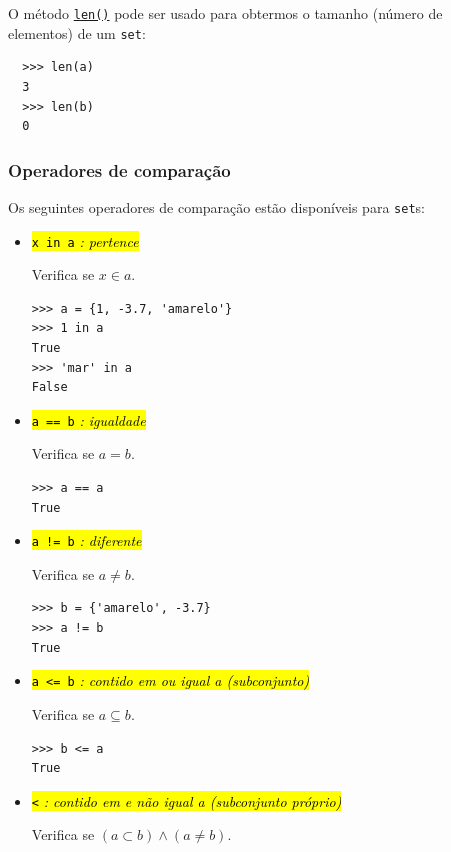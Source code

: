 O método \href{https://docs.python.org/3/library/functions.html#len}{\lstinline+len()+} pode ser usado para obtermos o tamanho (número de elementos) de um \lstinline+set+:
\begin{lstlisting}
  >>> len(a)
  3
  >>> len(b)
  0
\end{lstlisting}

\subsubsection{Operadores de comparação}\label{cap_lingua_sec_colecao:sssec:opcomp}

Os seguintes operadores de comparação estão disponíveis para \lstinline+set+s:
\begin{itemize}
\item \hl{{\lstinline+x in a+} \emph{: pertence}}

  Verifica se $x\in a$.

\begin{lstlisting}
>>> a = {1, -3.7, 'amarelo'}
>>> 1 in a
True
>>> 'mar' in a
False
\end{lstlisting}

\item \hl{{\lstinline+a == b+} \emph{: igualdade}}

  Verifica se $a = b$.

\begin{lstlisting}
>>> a == a
True
\end{lstlisting}

\item \hl{{\lstinline+a != b+} \emph{: diferente}}

  Verifica se $a \neq b$.

\begin{lstlisting}
>>> b = {'amarelo', -3.7}
>>> a != b
True
\end{lstlisting}
  
\item \hl{{\lstinline+a <= b+} \emph{: contido em ou igual a (subconjunto)}}

  Verifica se $a \subseteq b$.

\begin{lstlisting}
>>> b <= a
True
\end{lstlisting}

\item \hl{{\lstinline+<+} \emph{: contido em e não igual a (subconjunto próprio)}}

  Verifica se $(a\subset b)\land (a\neq b)$.


\end{itemize}
